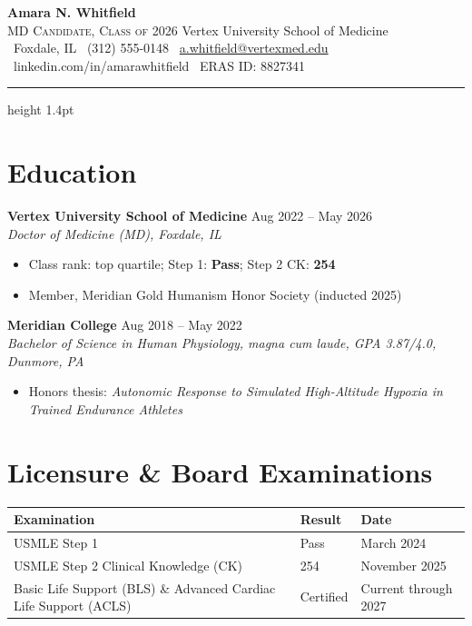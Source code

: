 \documentclass[10pt,letterpaper]{article}
\newcommand{\entryhead}[3]{%
  {\bfseries #1} \hfill {\color{midgray}\small #2}\\
  {\itshape\small #3}%
}
\begin{document}
\begin{center}
  {\fontsize{22}{24}\selectfont\bfseries\color{primary} Amara N. Whitfield}\\[3pt]
  {\small\color{midgray} \textsc{MD Candidate, Class of 2026} \;\textbar\; Vertex University School of Medicine}\\[5pt]
  {\small
    \faMapMarker\ Foxdale, IL \quad
    \faPhone\ (312) 555-0148 \quad
    \faEnvelope\ \href{mailto:a.whitfield@vertexmed.edu}{a.whitfield@vertexmed.edu} \quad
    \faLinkedin\ linkedin.com/in/amarawhitfield \quad
    \faGlobe\ ERAS ID: 8827341
  }
\end{center}
\vspace{-8pt}
{\color{primary}\hrule height 1.4pt}
\vspace{2pt}

\section{Education}

\entryhead{Vertex University School of Medicine}{Aug 2022 -- May 2026}{Doctor of Medicine (MD), Foxdale, IL}
\begin{itemize}
  \item Class rank: top quartile; Step 1: \textbf{Pass}; Step 2 CK: \textbf{254}
  \item Member, Meridian Gold Humanism Honor Society (inducted 2025)
\end{itemize}

\entryhead{Meridian College}{Aug 2018 -- May 2022}{Bachelor of Science in Human Physiology, \textit{magna cum laude}, GPA 3.87/4.0, Dunmore, PA}
\begin{itemize}
  \item Honors thesis: \textit{Autonomic Response to Simulated High-Altitude Hypoxia in Trained Endurance Athletes}
\end{itemize}

\section{Licensure \& Board Examinations}
\vspace{-2pt}
\begin{tabularx}{\linewidth}{@{}X l l@{}}
\toprule
\textbf{Examination} & \textbf{Result} & \textbf{Date} \\
\midrule
USMLE Step 1 & Pass & March 2024 \\
USMLE Step 2 Clinical Knowledge (CK) & 254 & November 2025 \\
Basic Life Support (BLS) \& Advanced Cardiac Life Support (ACLS) & Certified & Current through 2027 \\
\bottomrule
\end{tabularx}
\end{document}

